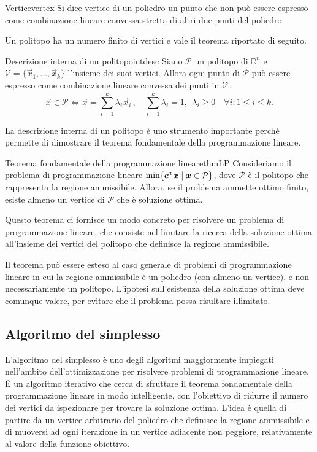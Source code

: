 \begin{definition}{Vertice}{vertex}
    Si dice vertice di un poliedro un punto che non può essere espresso come combinazione lineare convessa stretta di
    altri due punti del poliedro.
\end{definition}
\noindent
Un politopo ha un numero finito di vertici e vale il teorema riportato di seguito.
\begin{theorem}{Descrizione interna di un politopo}{intdesc}
    Siano \( \mathcal{P} \) un politopo di \( \mathbb{R}^n \) e \( \mathcal{V} = \{\vec{x}_1, \ldots, \vec{x}_k\} \)
    l'insieme dei suoi vertici. Allora ogni punto di \( \mathcal{P} \) può essere espresso come combinazione lineare
    convessa dei punti in \( \mathcal{V} \,\):
    \[
        \vec{x} \in \mathcal{P} \iff \vec{x} = \sum_{i=1}^k \lambda_i \vec{x}_i\,,\quad  \sum_{i=1}^k \lambda_i =
        1,\;\, \lambda_i \geq 0 \quad \forall i\colon 1 \leq i \leq k.
    \]
\end{theorem}
\noindent
La descrizione interna di un politopo è uno strumento importante perché permette di dimostrare il teorema fondamentale
della programmazione lineare.

\begin{theorem}{Teorema fondamentale della programmazione lineare}{thmLP}
    Consideriamo il problema di programmazione lineare \( \min\{\bm{c}^{\scriptscriptstyle\mathrm{T}}\bm{x} \mid \bm{x} \in \mathcal{P}\} \),
    dove \( \mathcal{P} \) è il politopo che rappresenta la regione ammissibile. Allora, se il problema ammette ottimo
    finito, esiste almeno un vertice di \( \mathcal{P} \) che è soluzione ottima.
\end{theorem}
\noindent
Questo teorema ci fornisce un modo concreto per risolvere un problema di programmazione lineare, che consiste nel limitare
la ricerca della soluzione ottima all'insieme dei vertici del politopo che definisce la regione ammissibile.

Il teorema può essere esteso al caso generale di problemi di programmazione lineare in cui la regione ammissibile è un
poliedro (con almeno un vertice), e non necessariamente un politopo. L'ipotesi sull'esistenza della soluzione ottima
deve comunque valere, per evitare che il problema possa risultare illimitato.

\subsection{Algoritmo del simplesso}
L'algoritmo del simplesso è uno degli algoritmi maggiormente impiegati nell'ambito dell'ottimizzazione per risolvere
problemi di programmazione lineare. \`E un algoritmo iterativo che cerca di sfruttare il teorema fondamentale della
programmazione lineare in modo intelligente, con l'obiettivo di ridurre il numero dei vertici da ispezionare per trovare la
soluzione ottima. L'idea è quella di partire da un vertice arbitrario del poliedro che definisce la regione ammissibile
e di muoversi ad ogni iterazione in un vertice adiacente non peggiore, relativamente al valore della funzione obiettivo.

